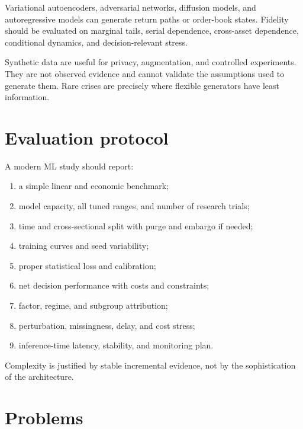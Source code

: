 Variational autoencoders, adversarial networks, diffusion models, and autoregressive
models can generate return paths or order-book states. Fidelity should be evaluated
on marginal tails, serial dependence, cross-asset dependence, conditional dynamics,
and decision-relevant stress.

Synthetic data are useful for privacy, augmentation, and controlled experiments.
They are not observed evidence and cannot validate the assumptions used to generate
them. Rare crises are precisely where flexible generators have least information.

\section{Evaluation protocol}

A modern ML study should report:

\begin{enumerate}
\item a simple linear and economic benchmark;
\item model capacity, all tuned ranges, and number of research trials;
\item time and cross-sectional split with purge and embargo if needed;
\item training curves and seed variability;
\item proper statistical loss and calibration;
\item net decision performance with costs and constraints;
\item factor, regime, and subgroup attribution;
\item perturbation, missingness, delay, and cost stress;
\item inference-time latency, stability, and monitoring plan.
\end{enumerate}

Complexity is justified by stable incremental evidence, not by the sophistication of
the architecture.

\section{Problems}

